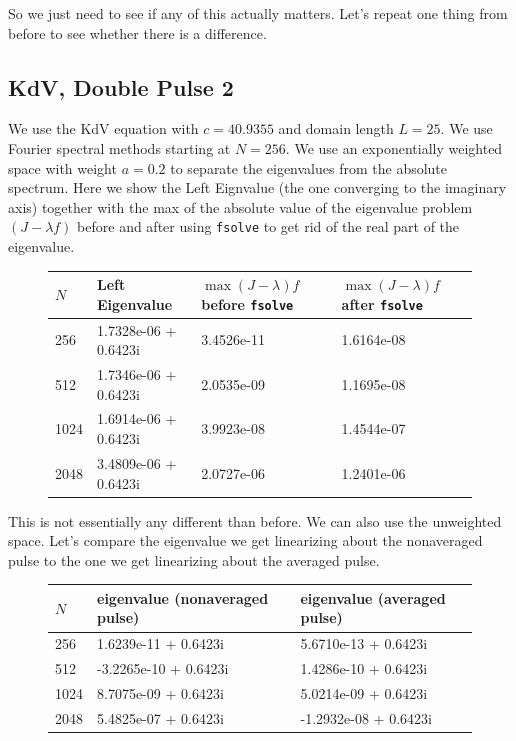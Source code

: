 \documentclass[12pt]{article}
\begin{document}
So we just need to see if any of this actually matters. Let's repeat one thing from before to see whether there is a difference. 

\subsection*{KdV, Double Pulse 2}
We use the KdV equation with $c = 40.9355$ and domain length $L = 25$. We use Fourier spectral methods starting at $N = 256$. We use an exponentially weighted space with weight $a = 0.2$ to separate the eigenvalues from the absolute spectrum. Here we show the Left Eignvalue (the one converging to the imaginary axis) together with the max of the absolute value of the eigenvalue problem $ (J -\lambda f)$ before and after using \texttt{fsolve} to get rid of the real part of the eigenvalue.

\begin{figure}[H]
\begin{tabular}{l|lll}
  $N$   &  Left Eigenvalue & $ \max (J -\lambda )f$ before \texttt{fsolve}  &  $\max (J -\lambda) f$ after \texttt{fsolve} \\ \hline
  256   &  1.7328e-06 + 0.6423i  &  3.4526e-11 &   1.6164e-08   \\ 
  512   &  1.7346e-06 + 0.6423i  &  2.0535e-09 &   1.1695e-08   \\ 
  1024  &  1.6914e-06 + 0.6423i  &  3.9923e-08 &   1.4544e-07   \\
  2048  &  3.4809e-06 + 0.6423i  &  2.0727e-06 &   1.2401e-06   \\
\end{tabular}
\end{figure}

This is not essentially any different than before. We can also use the unweighted space. Let's compare the eigenvalue we get linearizing about the nonaveraged pulse to the one we get linearizing about the averaged pulse.

\begin{figure}[H]
\begin{tabular}{l|ll}
  $N$   &  eigenvalue (nonaveraged pulse) & eigenvalue (averaged pulse) \\ \hline
  256   &  1.6239e-11  + 0.6423i   &  5.6710e-13 + 0.6423i  \\ 
  512   &  -3.2265e-10 + 0.6423i   &  1.4286e-10 + 0.6423i  \\ 
  1024  &  8.7075e-09  + 0.6423i   &  5.0214e-09 + 0.6423i  \\
  2048  &  5.4825e-07  + 0.6423i   &  -1.2932e-08 + 0.6423i  \\
\end{tabular}
\end{figure}
\end{document}
